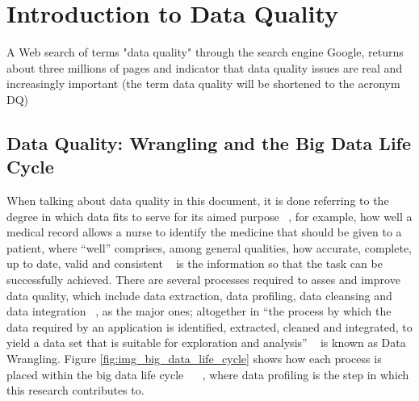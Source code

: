 

\ifpdf
    \graphicspath{{Chapter1/Figs/Raster/}{Chapter1/Figs/PDF/}{Chapter1/Figs/}}
\else
    \graphicspath{{Chapter1/Figs/Vector/}{Chapter1/Figs/}}
\fi

\chapter{Introduction to Data Quality}

A Web search of terms "data quality" through the search engine Google, returns about three millions of pages
and indicator that data quality issues are real and increasingly important (the term data quality will be shortened to the acronym DQ)

\ifpdf
    \graphicspath{{Chapter1/Figs/Raster/}{Chapter1/Figs/PDF/}{Chapter1/Figs/}}
\else
    \graphicspath{{Chapter1/Figs/Vector/}{Chapter1/Figs/}}
\fi



\section{Data Quality: Wrangling and the Big Data Life Cycle}

When talking about data quality in this document, it is done referring to the degree in
which data fits to serve for its aimed purpose ~\cite{MargaretRouse}, for example, how well a medical
record allows a nurse to identify the medicine that should be given to a patient, where
“well” comprises, among general qualities, how accurate, complete, up to date, valid
and consistent ~\cite{DAMA2013} is the information so that the task can be successfully achieved.
There are several processes required to asses and improve data quality, which include data extraction, data profiling, data cleansing and data integration ~\cite{JagadishGehrkeLabrindisPapakonstantinou}, as the
major ones; altogether in “the process by which the data required by an application is
identified, extracted, cleaned and integrated, to yield a data set that is suitable for exploration and analysis” ~\cite{NormanPaton} is known as Data Wrangling. 
Figure \ref{fig:img_big_data_life_cycle} shows how each process is placed within the big data life 
cycle ~\cite{ComputingResearchAssociation} 
~\cite{JagadishGehrkeLabrindisPapakonstantinou}, where data profiling is the step in which this research contributes to.

